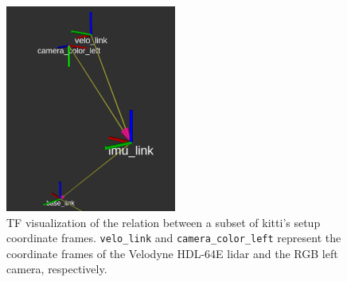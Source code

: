 \begin{figure}[H]
	\centering
	\includegraphics[width=0.5\textwidth]{img/KITTI/tf.png}
	\caption{TF visualization of the relation between a subset of \ac{kitti}'s setup coordinate frames. \texttt{velo\_link} and \texttt{camera\_color\_left} represent the coordinate frames of the Velodyne HDL-64E \ac{lidar} and the RGB left camera, respectively.}
	\label{fig:kitti-tf-frames}
\end{figure}

